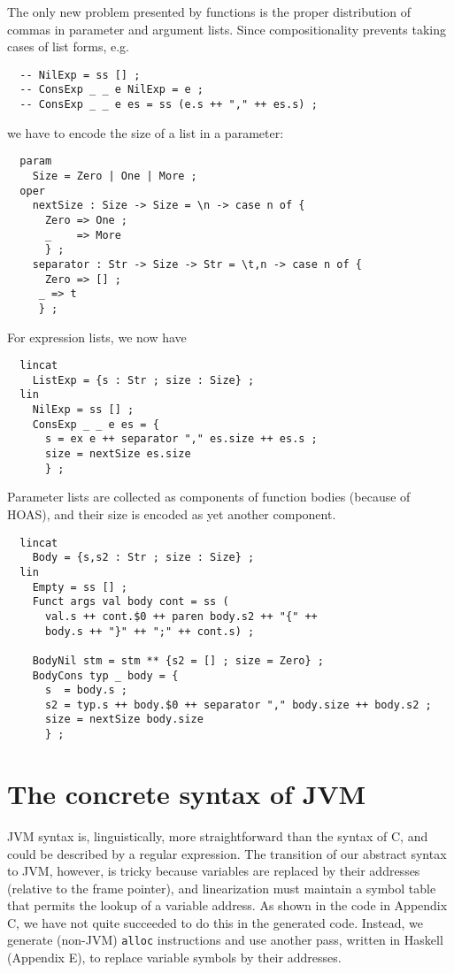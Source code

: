 \documentclass[12pt]{article}
\begin{document}
The only new problem presented by functions is the proper
distribution of commas in parameter and argument lists.
Since compositionality prevents taking cases of list forms, e.g.
\begin{verbatim}
  -- NilExp = ss [] ;
  -- ConsExp _ _ e NilExp = e ;
  -- ConsExp _ _ e es = ss (e.s ++ "," ++ es.s) ;
\end{verbatim}
we have to encode the size of a list in a parameter:
\begin{verbatim}
  param
    Size = Zero | One | More ;
  oper
    nextSize : Size -> Size = \n -> case n of {
      Zero => One ;
      _    => More
      } ;
    separator : Str -> Size -> Str = \t,n -> case n of {
      Zero => [] ;
     _ => t
     } ;
\end{verbatim}
For expression lists, we now have
\begin{verbatim}
  lincat 
    ListExp = {s : Str ; size : Size} ;
  lin
    NilExp = ss [] ;
    ConsExp _ _ e es = {
      s = ex e ++ separator "," es.size ++ es.s ;
      size = nextSize es.size
      } ;
\end{verbatim}
Parameter lists are collected as components of function bodies
(because of HOAS), and their size is encoded as yet another 
component.
\begin{verbatim}
  lincat
    Body = {s,s2 : Str ; size : Size} ;
  lin
    Empty = ss [] ;
    Funct args val body cont = ss (
      val.s ++ cont.$0 ++ paren body.s2 ++ "{" ++ 
      body.s ++ "}" ++ ";" ++ cont.s) ;

    BodyNil stm = stm ** {s2 = [] ; size = Zero} ;
    BodyCons typ _ body = {
      s  = body.s ; 
      s2 = typ.s ++ body.$0 ++ separator "," body.size ++ body.s2 ;
      size = nextSize body.size
      } ;
\end{verbatim}



\section{The concrete syntax of JVM}

JVM syntax is, linguistically, more straightforward than
the syntax of C, and could be described by a regular
expression. The transition of our abstract syntax to JVM,
however, is tricky because variables are replaced by
their addresses (relative to the frame pointer), and
linearization must maintain a symbol table that permits
the lookup of a variable address. As shown in the code
in Appendix C, we have not quite succeeded to do this
in the generated code. Instead, we generate (non-JVM)
\texttt{alloc} instructions and use another pass,
written in Haskell (Appendix E), to replace variable
symbols by their addresses.
\end{document}

